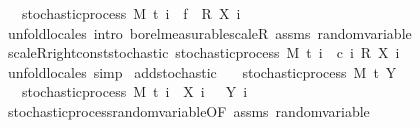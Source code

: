 \begin{isabellebody}
\ \ \ {\isachardoublequoteopen}stochastic{\isacharunderscore}{\kern0pt}process\ M\ t\ {\isacharparenleft}{\kern0pt}{\isasymlambda}i\ {\isasymxi}{\isachardot}{\kern0pt}\ f\ {\isasymxi}\ {\isacharasterisk}{\kern0pt}\isactrlsub R\ {\isacharparenleft}{\kern0pt}X\ i\ {\isasymxi}{\isacharparenright}{\kern0pt}{\isacharparenright}{\kern0pt}{\isachardoublequoteclose}\ \isanewline
%
\isadelimproof
\ \ %
\endisadelimproof
%
\isatagproof
{}\isamarkupfalse%
\ {\isacharparenleft}{\kern0pt}unfold{\isacharunderscore}{\kern0pt}locales{\isacharparenright}{\kern0pt}\ {\isacharparenleft}{\kern0pt}intro\ borel{\isacharunderscore}{\kern0pt}measurable{\isacharunderscore}{\kern0pt}scaleR\ assms\ random{\isacharunderscore}{\kern0pt}variable{\isacharparenright}{\kern0pt}%
\endisatagproof
{\isafoldproof}%
%
\isadelimproof
\isanewline
%
\endisadelimproof
\isanewline
{}\isamarkupfalse%
\ scaleR{\isacharunderscore}{\kern0pt}right{\isacharunderscore}{\kern0pt}const{\isacharunderscore}{\kern0pt}stochastic{\isacharcolon}{\kern0pt}\ {\isachardoublequoteopen}stochastic{\isacharunderscore}{\kern0pt}process\ M\ t\ {\isacharparenleft}{\kern0pt}{\isasymlambda}i\ {\isasymxi}{\isachardot}{\kern0pt}\ c\ i\ {\isacharasterisk}{\kern0pt}\isactrlsub R\ {\isacharparenleft}{\kern0pt}X\ i\ {\isasymxi}{\isacharparenright}{\kern0pt}{\isacharparenright}{\kern0pt}{\isachardoublequoteclose}\isanewline
%
\isadelimproof
\ \ %
\endisadelimproof
%
\isatagproof
{}\isamarkupfalse%
\ {\isacharparenleft}{\kern0pt}unfold{\isacharunderscore}{\kern0pt}locales{\isacharparenright}{\kern0pt}\ simp%
\endisatagproof
{\isafoldproof}%
%
\isadelimproof
\isanewline
%
\endisadelimproof
\isanewline
{}\isamarkupfalse%
\ add{\isacharunderscore}{\kern0pt}stochastic{\isacharcolon}{\kern0pt}\isanewline
\ \ \ {\isachardoublequoteopen}stochastic{\isacharunderscore}{\kern0pt}process\ M\ t\ Y{\isachardoublequoteclose}\isanewline
\ \ \ {\isachardoublequoteopen}stochastic{\isacharunderscore}{\kern0pt}process\ M\ t\ {\isacharparenleft}{\kern0pt}{\isasymlambda}i\ {\isasymxi}{\isachardot}{\kern0pt}\ X\ i\ {\isasymxi}\ {\isacharplus}{\kern0pt}\ Y\ i\ {\isasymxi}{\isacharparenright}{\kern0pt}{\isachardoublequoteclose}\isanewline
%
\isadelimproof
\ \ %
\endisadelimproof
%
\isatagproof
{}\isamarkupfalse%
\ stochastic{\isacharunderscore}{\kern0pt}process{\isachardot}{\kern0pt}random{\isacharunderscore}{\kern0pt}variable{\isacharbrackleft}{\kern0pt}OF\ assms{\isacharbrackright}{\kern0pt}\ random{\isacharunderscore}{\kern0pt}variable\ \isamarkupfalse%

\end{isabellebody}
